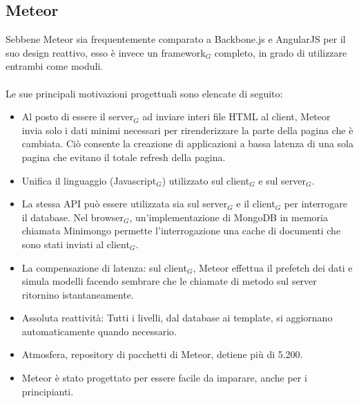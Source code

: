 \subsection{Meteor}

Sebbene Meteor sia frequentemente comparato a Backbone.js e AngularJS per il suo design reattivo, esso è invece un framework$_G$ completo, in grado di utilizzare entrambi come moduli.\\
\\
Le sue principali motivazioni progettuali sono elencate di seguito:

\begin{itemize}
	\item Al posto di essere il server$_G$ ad inviare interi file HTML al client, Meteor invia solo i dati minimi necessari per rirenderizzare la parte della pagina che è cambiata. Ciò consente la creazione di applicazioni a bassa latenza di una sola pagina che evitano il totale refresh della pagina.
	\item Unifica il linguaggio (Javascript$_G$) utilizzato sul client$_G$ e sul server$_G$.
	\item La stessa API può essere utilizzata sia sul server$_G$ e il client$_G$ per interrogare il database.
	Nel browser$_G$, un'implementazione di MongoDB in memoria chiamata Minimongo permette l'interrogazione una cache di documenti che sono stati inviati al client$_G$. 
	\item La compensazione di latenza: sul client$_G$, Meteor effettua il prefetch dei dati e simula modelli facendo sembrare che le chiamate di metodo sul server ritornino istantaneamente.
	\item Assoluta reattività: Tutti i livelli, dal database ai template, si aggiornano automaticamente quando necessario.
	\item Atmosfera, repository di pacchetti di Meteor, detiene più di 5.200.
	\item Meteor è stato progettato per essere facile da imparare, anche per i principianti.
\end{itemize}

